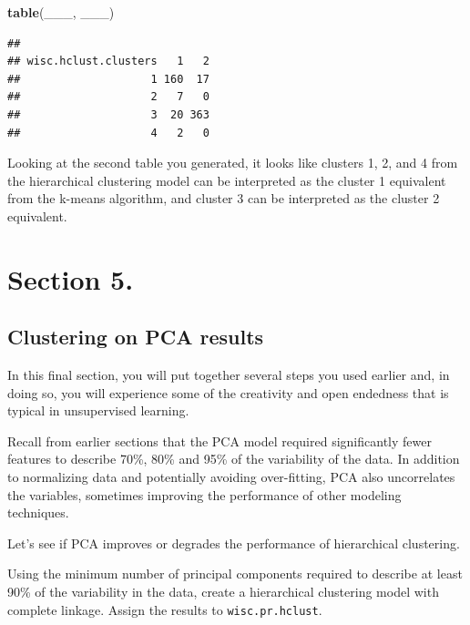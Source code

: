 \documentclass[]{article}
\newenvironment{Shaded}{\begin{snugshade}}{\end{snugshade}}
\newcommand{\KeywordTok}[1]{\textcolor[rgb]{0.13,0.29,0.53}{\textbf{#1}}}
\newcommand{\DataTypeTok}[1]{\textcolor[rgb]{0.13,0.29,0.53}{#1}}
\newcommand{\StringTok}[1]{\textcolor[rgb]{0.31,0.60,0.02}{#1}}
\newcommand{\NormalTok}[1]{#1}
\begin{document}
\begin{Shaded}
\begin{Highlighting}[]
\KeywordTok{table}\NormalTok{(___, ___)}
\end{Highlighting}
\end{Shaded}

\begin{verbatim}
##                     
## wisc.hclust.clusters   1   2
##                    1 160  17
##                    2   7   0
##                    3  20 363
##                    4   2   0
\end{verbatim}

Looking at the second table you generated, it looks like clusters 1, 2,
and 4 from the hierarchical clustering model can be interpreted as the
cluster 1 equivalent from the k-means algorithm, and cluster 3 can be
interpreted as the cluster 2 equivalent.

\section{Section 5.}\label{section-5.}

\subsection{Clustering on PCA results}\label{clustering-on-pca-results}

In this final section, you will put together several steps you used
earlier and, in doing so, you will experience some of the creativity and
open endedness that is typical in unsupervised learning.

Recall from earlier sections that the PCA model required significantly
fewer features to describe 70\%, 80\% and 95\% of the variability of the
data. In addition to normalizing data and potentially avoiding
over-fitting, PCA also uncorrelates the variables, sometimes improving
the performance of other modeling techniques.

Let's see if PCA improves or degrades the performance of hierarchical
clustering.

Using the minimum number of principal components required to describe at
least 90\% of the variability in the data, create a hierarchical
clustering model with complete linkage. Assign the results to
\texttt{wisc.pr.hclust}.

\begin{Shaded}
\end{Shaded}
\end{document}
